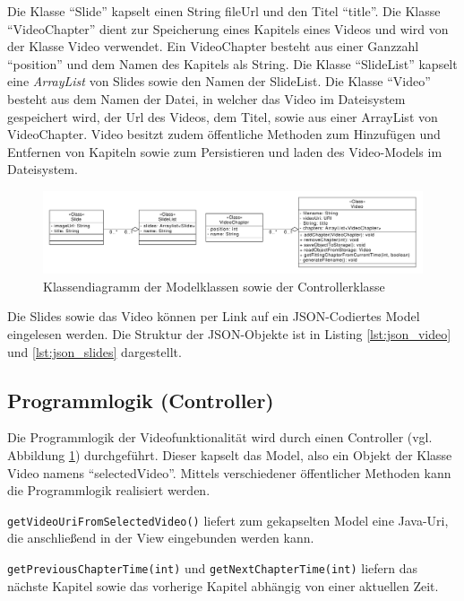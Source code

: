 Die Klasse \enquote{Slide} kapselt einen String fileUrl und den Titel \enquote{title}. 
Die Klasse \enquote{VideoChapter} dient zur Speicherung eines Kapitels eines Videos und wird von der Klasse Video verwendet. Ein VideoChapter besteht aus einer Ganzzahl \enquote{position} und dem Namen des Kapitels als String. Die Klasse \enquote{SlideList} kapselt eine \emph{ArrayList} von Slides sowie den Namen der SlideList.
Die Klasse \enquote{Video} besteht aus dem Namen der Datei, in welcher das Video im Dateisystem gespeichert wird, der Url des Videos, dem Titel, sowie aus einer ArrayList von VideoChapter. Video besitzt zudem öffentliche Methoden zum Hinzufügen und Entfernen von Kapiteln sowie zum Persistieren und laden des Video-Models im Dateisystem.
\begin{figure}[htbp]
    \centering
    \includegraphics[width=1\textwidth]{data/bilder/Klassendiagramm.pdf}
    \caption{Klassendiagramm der Modelklassen sowie der Controllerklasse}
    \label{fig:Klassendiagramm}
\end{figure}

Die Slides sowie das Video können per Link auf ein JSON-Codiertes Model eingelesen werden. Die Struktur der JSON-Objekte ist in Listing \ref{lst:json_video} und \ref{lst:json_slides} dargestellt.
%
%
\subsection{Programmlogik (Controller)}
Die Programmlogik der Videofunktionalität wird durch einen Controller (vgl. Abbildung \ref{fig:Klassendiagramm}) durchgeführt. Dieser kapselt das Model, also ein Objekt der Klasse Video namens \enquote{selectedVideo}. Mittels verschiedener öffentlicher Methoden kann die Programmlogik realisiert werden. 

\texttt{getVideoUriFromSelectedVideo()} liefert zum gekapselten Model eine Java-Uri, die anschließend in der View eingebunden werden kann.

\texttt{getPreviousChapterTime(int)} und \texttt{getNextChapterTime(int)} liefern das nächste Kapitel sowie das vorherige Kapitel abhängig von einer aktuellen Zeit. 

